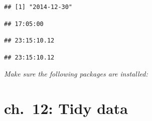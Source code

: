 \documentclass[]{book}
\newenvironment{Shaded}{\begin{snugshade}}{\end{snugshade}}
\newcommand{\KeywordTok}[1]{\textcolor[rgb]{0.13,0.29,0.53}{\textbf{#1}}}
\newcommand{\NormalTok}[1]{#1}
\newcommand{\StringTok}[1]{\textcolor[rgb]{0.31,0.60,0.02}{#1}}
\theoremstyle{definition}
\theoremstyle{definition}
\theoremstyle{definition}
\theoremstyle{remark}
\begin{document}
\begin{Shaded}
\end{Shaded}

\begin{verbatim}
## [1] "2014-12-30"
\end{verbatim}

\begin{Shaded}
\end{Shaded}

\begin{verbatim}
## 17:05:00
\end{verbatim}

\begin{Shaded}
\end{Shaded}

\begin{verbatim}
## 23:15:10.12
\end{verbatim}

\begin{Shaded}
\end{Shaded}

\begin{verbatim}
## 23:15:10.12
\end{verbatim}

\emph{Make sure the following packages are installed:}

\hypertarget{ch.-12-tidy-data}{%
\chapter{ch.~12: Tidy data}\label{ch.-12-tidy-data}}
\end{document}
